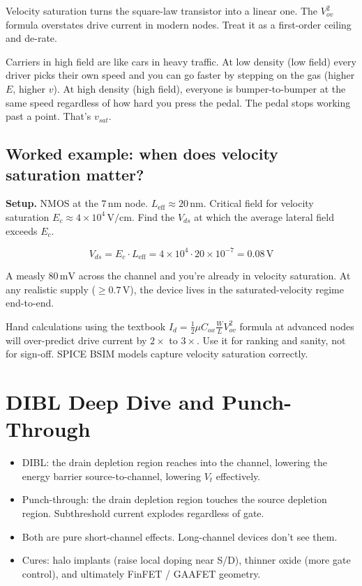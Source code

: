 \documentclass[11pt]{article}
\begin{document}
\begin{keyidea}
Velocity saturation turns the square-law transistor into a linear one. The $V_{ov}^2$ formula overstates drive current in modern nodes. Treat it as a first-order ceiling and de-rate.
\end{keyidea}

\begin{hook}
Carriers in high field are like cars in heavy traffic. At low density (low field) every driver picks their own speed and you can go faster by stepping on the gas (higher $E$, higher $v$). At high density (high field), everyone is bumper-to-bumper at the same speed regardless of how hard you press the pedal. The pedal stops working past a point. That's $v_{sat}$.
\end{hook}

\subsection{Worked example: when does velocity saturation matter?}

\textbf{Setup.} NMOS at the $7\,\text{nm}$ node. $L_{\text{eff}} \approx 20\,\text{nm}$. Critical field for velocity saturation $E_c \approx 4\times 10^4\,\text{V/cm}$. Find the $V_{ds}$ at which the average lateral field exceeds $E_c$.

\[
V_{ds} = E_c \cdot L_{\text{eff}} = 4\times 10^4 \cdot 20\times 10^{-7} = 0.08\,\text{V}
\]

A measly $80\,\text{mV}$ across the channel and you're already in velocity saturation. At any realistic supply ($\geq 0.7\,\text{V}$), the device lives in the saturated-velocity regime end-to-end.

\begin{pitfall}
Hand calculations using the textbook $I_d = \tfrac{1}{2}\mu C_{ox}\frac{W}{L}V_{ov}^2$ formula at advanced nodes will over-predict drive current by $2\times$ to $3\times$. Use it for ranking and sanity, not for sign-off. SPICE BSIM models capture velocity saturation correctly.
\end{pitfall}

\section{DIBL Deep Dive and Punch-Through}

\begin{tldr}
\begin{itemize}[leftmargin=*]
\item DIBL: the drain depletion region reaches into the channel, lowering the energy barrier source-to-channel, lowering $V_t$ effectively.
\item Punch-through: the drain depletion region touches the source depletion region. Subthreshold current explodes regardless of gate.
\item Both are pure short-channel effects. Long-channel devices don't see them.
\item Cures: halo implants (raise local doping near S/D), thinner oxide (more gate control), and ultimately FinFET / GAAFET geometry.
\end{itemize}
\end{tldr}
\end{document}

